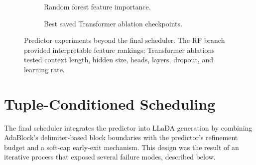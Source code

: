 \documentclass[11pt]{article}
\begin{document}
\begin{figure}[t!]
  \centering
  \begin{subfigure}{0.47\linewidth}
    \centering
    \caption{Random forest feature importance.}
  \end{subfigure}
  \hfill
  \begin{subfigure}{0.49\linewidth}
    \centering
    \caption{Best saved Transformer ablation checkpoints.}
  \end{subfigure}
  \caption{Predictor experiments beyond the final scheduler. The RF branch provided interpretable feature rankings; Transformer ablations tested context length, hidden size, heads, layers, dropout, and learning rate.}
  \label{fig:rf-ablation}
\end{figure}

\section{Tuple-Conditioned Scheduling}

The final scheduler integrates the predictor into LLaDA generation by combining AdaBlock's delimiter-based block boundaries with the predictor's refinement budget and a soft-cap early-exit mechanism. This design was the result of an iterative process that exposed several failure modes, described below.
\end{document}

